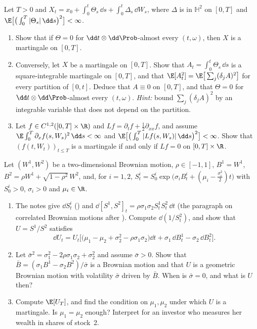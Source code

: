 \begin{exercise}\label{ex:itf-martingale-drift}
\medium Let $T>0$ and $X_t=x_0+\int_0^t\Theta_s\,\dd s+\int_0^t\Delta_s\,\dd W_s$, where $\Delta$ is in
$\mathbb H^2$ on $[0,T]$ and $\E\big[\big(\int_0^T|\Theta_s|\,\dd s\big)^2\big]<\infty$.
\begin{enumerate}[label=(\alph*)]
  \item Show that if $\Theta=0$ for $\dd t\otimes\dd\Prob$-almost every $(t,\omega)$, then $X$ is a
    martingale on $[0,T]$.
  \item Conversely, let $X$ be a martingale on $[0,T]$. Show that $A_t=\int_0^t\Theta_s\,\dd s$ is a
    square-integrable martingale on $[0,T]$, and that $\E[A_t^2]=\E\big[\sum_j(\delta_jA)^2\big]$ for every
    partition of $[0,t]$. Deduce that $A\equiv0$ on $[0,T]$, and that $\Theta=0$ for
    $\dd t\otimes\dd\Prob$-almost every $(t,\omega)$. \emph{Hint:} bound $\sum_j(\delta_jA)^2$ by an
    integrable variable that does not depend on the partition.
  \item Let $f\in C^{1,2}([0,T]\times\R)$ and $Lf=\partial_tf+\frac12\partial_{xx}f$, and assume
    $\E\int_0^T\partial_xf(s,W_s)^2\,\dd s<\infty$ and
    $\E\big[\big(\int_0^T|Lf(s,W_s)|\,\dd s\big)^2\big]<\infty$. Show that $(f(t,W_t))_{t\le T}$ is a
    martingale if and only if $Lf=0$ on $[0,T]\times\R$.
\end{enumerate}
\end{exercise}

\begin{exercise}\label{ex:itf-ratio}
\medium Let $(W^1,W^2)$ be a two-dimensional Brownian motion, $\rho\in[-1,1]$, $B^1=W^1$,
$B^2=\rho W^1+\sqrt{1-\rho^2}\,W^2$, and, for $i=1,2$,
$S^i_t=S^i_0\exp\big(\sigma_iB^i_t+(\mu_i-\frac{\sigma_i^2}2)t\big)$ with $S^i_0>0$, $\sigma_i>0$ and
$\mu_i\in\R$.
\begin{enumerate}[label=(\alph*)]
  \item The notes give $\dd S^i_t$ () and
    $\dd[S^1,S^2]_t=\rho\sigma_1\sigma_2S^1_tS^2_t\,\dd t$ (the paragraph on correlated Brownian motions
    after ). Compute $\dd(1/S^2_t)$, and show that $U=S^1/S^2$ satisfies
    \[
      \dd U_t=U_t\Big[\big(\mu_1-\mu_2+\sigma_2^2-\rho\sigma_1\sigma_2\big)\dd t+\sigma_1\,\dd B^1_t-\sigma_2\,\dd B^2_t\Big].
    \]
  \item Let $\bar\sigma^2=\sigma_1^2-2\rho\sigma_1\sigma_2+\sigma_2^2$ and assume $\bar\sigma>0$. Show
    that $\bar B=(\sigma_1B^1-\sigma_2B^2)/\bar\sigma$ is a Brownian motion and that $U$ is a geometric
    Brownian motion with volatility $\bar\sigma$ driven by $\bar B$. When is $\bar\sigma=0$, and what is
    $U$ then?
  \item Compute $\E[U_T]$, and find the condition on $\mu_1,\mu_2$ under which $U$ is a martingale. Is
    $\mu_1=\mu_2$ enough? Interpret for an investor who measures her wealth in shares of stock~2.
\end{enumerate}
\end{exercise}

